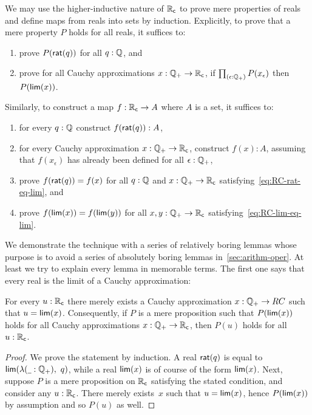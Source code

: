 We may use the higher-inductive nature of $\mathbb{R}_\mathsf{c}$ to prove mere properties of reals and
define maps from reals into sets by induction. Explicitly, to prove that a mere property
$P$ holds for all reals, it suffices to:
%
\begin{enumerate}
\item prove $P(\mathsf{rat}(q))$ for all $q : \mathbb{Q}$, and
\item prove for all Cauchy approximations $x : \mathbb{Q}_{+} \to \mathbb{R}_\mathsf{c}$, if $\prd{\epsilon : \Qp}
  P(x_\epsilon)$ then $P(\mathsf{lim}(x))$.
\end{enumerate}
%
Similarly, to construct a map $f : \mathbb{R}_\mathsf{c} \to A$ where $A$ is a set, it suffices to:
%
\begin{enumerate}
\item for every $q : \mathbb{Q}$ construct $f(\mathsf{rat}(q)) : A$,
\item for every Cauchy approximation $x : \mathbb{Q}_{+} \to \mathbb{R}_\mathsf{c}$, construct $f(x) : A$,
  assuming that $f(x_\epsilon)$ has already been defined for all $\epsilon : \mathbb{Q}_{+}$,
\item prove $f(\mathsf{rat}(q)) = f(x)$ for all $q : \mathbb{Q}$ and $x : \mathbb{Q}_{+} \to \mathbb{R}_\mathsf{c}$
  satisfying~\eqref{eq:RC-rat-eq-lim}, and
\item prove $f(\mathsf{lim}(x)) = f(\mathsf{lim}(y))$ for all $x, y : \mathbb{Q}_{+} \to \mathbb{R}_\mathsf{c}$
  satisfying~\eqref{eq:RC-lim-eq-lim}.
\end{enumerate}
%
We demonstrate the technique with a series of relatively boring lemmas whose purpose is to
avoid a series of absolutely boring lemmas in~\autoref{sec:arithm-oper}. At least we try
to explain every lemma in memorable terms. The first one says that every real is the limit
of a Cauchy approximation:

\begin{lem} \label{RC-lim-onto}
  For every $u : \mathbb{R}_\mathsf{c}$ there merely exists a Cauchy approximation $x : \mathbb{Q}_{+} \to RC$ such
  that $u = \mathsf{lim}(x)$. Consequently, if $P$ is a mere proposition such that
  $P(\mathsf{lim}(x))$ holds for all Cauchy approximations $x : \mathbb{Q}_{+} \to \mathbb{R}_\mathsf{c}$, then $P(u)$ holds
  for all $u : \mathbb{R}_\mathsf{c}$.
\end{lem}

\begin{proof}
  We prove the statement by induction. A real $\mathsf{rat}(q)$ is equal to $\rclim(\lam{\blank
    : \Qp} q)$, while a real $\mathsf{lim}(x)$ is of course of the form $\mathsf{lim}(x)$.
  Next, suppose $P$ is a mere proposition on $\mathbb{R}_\mathsf{c}$ satisfying the stated condition, and
  consider any $u : \mathbb{R}_\mathsf{c}$. There merely exists~$x$ such that $u = \mathsf{lim}(x)$, hence
  $P(\mathsf{lim}(x))$ by assumption and so $P(u)$ as well.
\end{proof}

